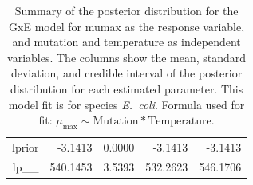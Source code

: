 \begin{table}[ht]
\begin{tabular}{rrrrr}
  lprior & -3.1413 & 0.0000 & -3.1413 & -3.1413 \\ 
  lp\_\_ & 540.1453 & 3.5393 & 532.2623 & 546.1706 \\ 
   \hline
\end{tabular}
\caption{Summary of the posterior distribution for the GxE model for mumax as the response variable, and mutation and temperature as independent variables. The columns show the mean, standard deviation, and credible interval of the posterior distribution for each estimated parameter. This model fit is for species \textit{E.~coli}.  Formula used for fit: $\mu_{\text{max}} \sim \text{Mutation} * \text{Temperature}$.} 
\label{supptab:GxE_mumax_Ecoli}
\end{table}



